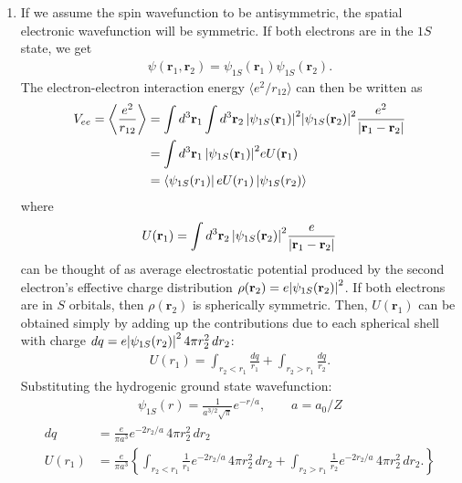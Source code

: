 \documentclass{article}
\theoremstyle{definition}
\newcommand{\lc}{\left\{}
\newcommand{\rc}{\right\}}
\begin{document}
\begin{enumerate}[label = \alph*)]

\item If we assume the spin wavefunction to be antisymmetric, the spatial electronic wavefunction
will be symmetric. If both electrons are in the $1S$ state, we get
\begin{align*}
\psi(\mathbf{r}_1, \mathbf{r}_2) = \psi_{1S}(\mathbf{r}_1)\psi_{1S}(\mathbf{r}_2).
\end{align*}
The electron-electron interaction energy $\langle e^2/r_{12} \rangle$ can then be written as
\begin{align*}
V_{ee} = \bigg\langle \frac{e^2}{r_{12}} \bigg\rangle  
&= \int d^3 \mathbf{r}_1 \int d^3 \mathbf{r}_2 \, 
\abs{\psi_{1S}(\mathbf{r}_1)}^2 \abs{\psi_{1S}(\mathbf{r}_2)}^2 \frac{e^2}{\abs{\mathbf{r}_1 - \mathbf{r}_2}} \\
&= \int d^3 \mathbf{r}_1 \, \abs{\psi_{1S}(\mathbf{r}_1)}^2 eU(\mathbf{r}_1) \\ 
&= \bra{\psi_{1S}({r}_1)} eU(r_1) \ket{\psi_{1S}(r_2)}
\end{align*}
where
\begin{align*}
U(\mathbf{r}_1) = \int d^3 \mathbf{r}_2 \, \abs{\psi_{1S} (\mathbf{r}_2)}^2 \frac{e}{\abs{\mathbf{r}_1 - \mathbf{r}_2}}
\end{align*}
can be thought of as average electrostatic potential produced by the second electron’s
effective charge distribution $\rho({\mathbf{r}_2})  = e \abs{\psi_{1S} (\mathbf{r}_2)}^2$. If both electrons are in $S$ orbitals, then $\rho(\mathbf{r}_2)$ is spherically symmetric. Then, $U(\mathbf{r}_1)$ can be obtained simply by adding up the contributions due to each spherical shell with charge $dq = e \abs{\psi_{1S}(r_2)}^2 \,4 \pi r_2^2 \,dr_2$:
\begin{align*}
U(r_1) = \int_{r_2 < r_1}  \frac{dq}{r_1}+ \int_{r_2 > r_1} \frac{dq}{r_2}.
\end{align*}
Substituting the hydrogenic ground state wavefunction:
\begin{align*}
\psi_{1S}(r) = \frac{1}{a^{3/2}\sqrt{\pi}} e^{-r/a}, \quad\quad a = a_0/Z
\end{align*}
\begin{align*}
dq &= \frac{e}{\pi a^3}  e^{-2r_2/a} \, 4\pi r_2^2 \, dr_2  \\
U(r_1) 
&= \frac{e}{\pi a^3} 
\lc  
\int_{r_2 < r_1}  \frac{1}{r_1} e^{-2r_2/a} \, 4\pi r_2^2 \, dr_2+ \int_{r_2 > r_1} \frac{1}{r_2} e^{-2r_2/a} \, 4\pi r_2^2 \, dr_2.
\rc\\

\end{align*}
\end{enumerate}
\end{document}
